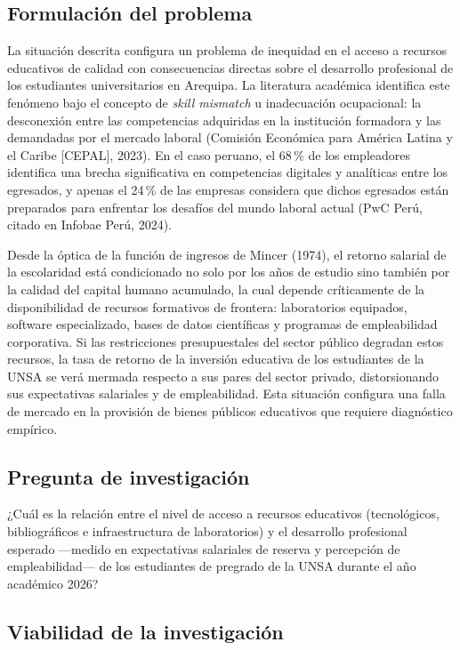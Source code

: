 \documentclass[11pt, a4paper]{article}
\begin{document}
\subsection{Formulación del problema}

La situación descrita configura un problema de inequidad en el acceso a recursos educativos de calidad con consecuencias directas sobre el desarrollo profesional de los estudiantes universitarios en Arequipa. La literatura académica identifica este fenómeno bajo el concepto de \textit{skill mismatch} u inadecuación ocupacional: la desconexión entre las competencias adquiridas en la institución formadora y las demandadas por el mercado laboral (Comisión Económica para América Latina y el Caribe [CEPAL], 2023). En el caso peruano, el 68\,\% de los empleadores identifica una brecha significativa en competencias digitales y analíticas entre los egresados, y apenas el 24\,\% de las empresas considera que dichos egresados están preparados para enfrentar los desafíos del mundo laboral actual (PwC Perú, citado en Infobae Perú, 2024).

Desde la óptica de la función de ingresos de Mincer (1974), el retorno salarial de la escolaridad está condicionado no solo por los años de estudio sino también por la calidad del capital humano acumulado, la cual depende críticamente de la disponibilidad de recursos formativos de frontera: laboratorios equipados, software especializado, bases de datos científicas y programas de empleabilidad corporativa. Si las restricciones presupuestales del sector público degradan estos recursos, la tasa de retorno de la inversión educativa de los estudiantes de la UNSA se verá mermada respecto a sus pares del sector privado, distorsionando sus expectativas salariales y de empleabilidad. Esta situación configura una falla de mercado en la provisión de bienes públicos educativos que requiere diagnóstico empírico.

\subsection{Pregunta de investigación}

¿Cuál es la relación entre el nivel de acceso a recursos educativos (tecnológicos, bibliográficos e infraestructura de laboratorios) y el desarrollo profesional esperado —medido en expectativas salariales de reserva y percepción de empleabilidad— de los estudiantes de pregrado de la UNSA durante el año académico 2026?

\subsection{Viabilidad de la investigación}
\end{document}

